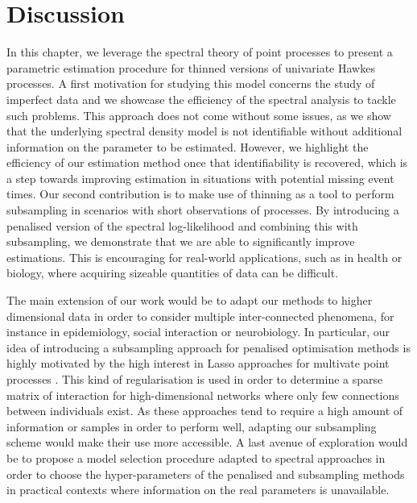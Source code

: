 \section{Discussion}
    In this chapter, we leverage the spectral theory of point processes to present a parametric estimation procedure for thinned versions of univariate Hawkes processes.
    A first motivation for studying this model concerns the study of imperfect data and we showcase the efficiency of the spectral analysis to tackle such problems.
    This approach does not come without some issues, as we show that the underlying spectral density model is not identifiable without additional information on the parameter to be estimated.
    However, we highlight the efficiency of our estimation method once that identifiability is recovered, which is a step towards improving estimation in situations with potential missing event times.
    Our second contribution is to make use of thinning as a tool to perform subsampling in scenarios with short observations of processes. 
    By introducing a penalised version of the spectral log-likelihood and combining this with subsampling, we demonstrate that we are able to significantly improve estimations. 
    This is encouraging for real-world applications, such as in health or biology, where acquiring sizeable quantities of data can be difficult.

    The main extension of our work would be to adapt our methods to higher dimensional data in order to consider multiple inter-connected phenomena, for instance in epidemiology, social interaction or neurobiology.
    In particular, our idea of introducing a subsampling approach for penalised optimisation methods is highly motivated by the high interest in Lasso approaches for multivate point processes \parencite{Reynaud2013, Hansen2015, Bacry2020}.
    This kind of regularisation is used in order to determine a sparse matrix of interaction for high-dimensional networks where only few connections between individuals exist.
    As these approaches tend to require a high amount of information or samples in order to perform well, adapting our subsampling scheme would make their use more accessible.
    A last avenue of exploration would be to propose a model selection procedure adapted to spectral approaches in order to choose the hyper-parameters of the penalised and subsampling methods in practical contexts where information on the real parameters is unavailable.




